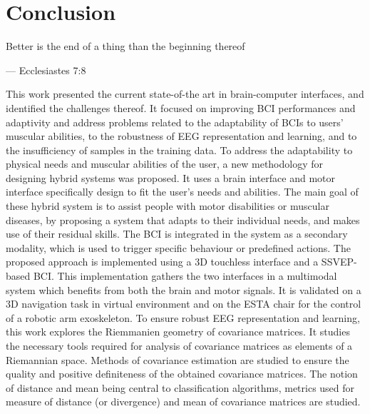 
\chapter{Conclusion}
\label{chap:conclusion}
\epigraph{Better is the end of a thing than the beginning thereof}{--- \textup{Ecclesiastes 7:8}}
This work presented the current state-of-the art in brain-computer interfaces, and identified the challenges thereof.
It focused on improving BCI performances and adaptivity and address problems related to the adaptability of BCIs to users' muscular abilities, to the robustness of EEG representation and learning, and to the insufficiency of samples in the training data.
To address the adaptability to physical needs and muscular abilities of the user, a new methodology for designing hybrid systems was proposed. 
It uses a brain interface and motor interface specifically design to fit the user's needs and abilities. 
The main goal of these hybrid system is to assist people with motor disabilities or muscular diseases, by proposing a system that adapts to their individual needs, and makes use of their residual skills.
The BCI is integrated in the system as a secondary modality, which is used to trigger specific behaviour or predefined actions.
The proposed approach is implemented using a 3D touchless interface and a SSVEP-based BCI.
This implementation gathers the two interfaces in a multimodal system which benefits from both the brain and motor signals. 
It is validated on a 3D  navigation task in virtual environment and on the ESTA chair for the control of a robotic arm exoskeleton. 
To ensure robust EEG representation and learning, this work explores the Riemmanien geometry of covariance matrices. 
It studies the necessary tools required for analysis of covariance matrices as elements of a Riemannian space.
Methods of covariance estimation are studied to ensure the quality and positive definiteness of the obtained covariance matrices. 
The notion of distance and mean being central to classification algorithms, metrics used for measure of distance (or divergence) and mean of covariance matrices are studied. 
